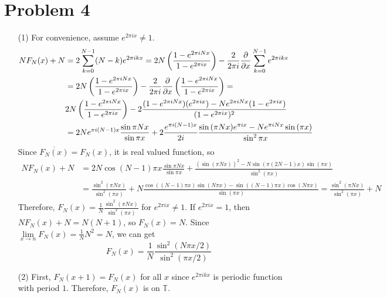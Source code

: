 \documentclass{article}
\begin{document}
\section*{Problem 4}
\begin{enumerate}
\item[(1)] For convenience, assume $e^{2\pi i x}\neq 1$.
\begin{equation*}
\begin{split}
NF_N(x)+N&=2\sum\limits_{k=0}^{N-1} (N-k)e^{2\pi i k x} = 2N\left(\frac{1-e^{2\pi i N x}}{1-e^{2\pi i x}}\right) - \frac{2}{2\pi i }\pdv{x} \sum\limits_{k=0}^{N-1}e^{2\pi i k x} \\
&=2N\left(\frac{1-e^{2\pi i N x}}{1-e^{2\pi i x}}\right)- \frac{2}{2\pi i }\pdv{x}\left(\frac{1-e^{2\pi i N x}}{1-e^{2\pi i x}}\right) = \\
&2N\left(\frac{1-e^{2\pi i N x}}{1-e^{2\pi i x}}\right) - 2\frac{(1-e^{2\pi i N x})(e^{2\pi i x}) - Ne^{2\pi i N x}(1-e^{2\pi i x})}{(1-e^{2\pi i x})^2} \\
&=2Ne^{\pi i (N-1)x} \frac{\sin{\pi N x}}{\sin{ \pi x}} + 2\frac{e^{\pi i (N-1)x}}{2i}\frac{\sin{(\pi N x)}e^{\pi i x}- Ne^{\pi i N x}\sin{(\pi x)}}{\sin^2{\pi x}}
\end{split}
\end{equation*}
Since $\overline{F_N(x)}=F_N(x)$, it is real valued function, so
\begin{equation*}
\begin{split}
NF_N(x)+N&=2N\cos{(N-1)\pi x}\frac{\sin{\pi N x}}{\sin{ \pi x}} + \frac{\left(\sin(\pi N x)\right)^2 -N \sin(\pi (2N-1) x)\sin(\pi x)}{\sin^2(\pi x)} \\
&=\frac{\sin^2(\pi N x)}{\sin^2(\pi x)} + N\frac{\cos((N-1)\pi x) \sin (N \pi x)- \sin((N-1)\pi x) \cos (N \pi x)}{\sin(\pi x)} = \frac{\sin^2(\pi N x)}{\sin^2(\pi x)} + N
\end{split}
\end{equation*}
Therefore, $F_N(x)=\frac{1}{N}\frac{\sin^2(\pi N x)}{\sin^2(\pi x)}$ for $e^{2\pi i x}\neq 1$. If $e^{2\pi i x}=1$, then $NF_N(x)+N=N(N+1)$, so $F_N(x)=N$. Since $\lim\limits_{x\rightarrow n}F_N(x) = \frac{1}{N}N^2=N$, we can get
\begin{equation*}
F_N(x)=\frac{1}{N}\frac{\sin^2(N\pi x/2)}{\sin^2{(\pi x/2)}}
\end{equation*}
\item[(2)] First, $F_N(x+1)=F_N(x)$ for all $x$ since $e^{2\pi i k x}$ is periodic function with period $1$. Therefore, $F_N(x)$ is on $\mathbb{T}$.
\begin{enumerate}

\end{enumerate}
\end{enumerate}
\end{document}
